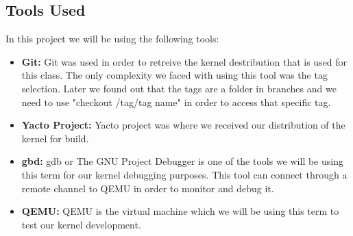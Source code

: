 \documentclass[journal,10pt,onecolumn,compsoc,letterpaper,draftclsnofoot,table,xcdraw]{IEEEtran} \usepackage[margin=0.75in]{geometry}
\begin{document}
\subsection{Tools Used}
In this project we will be using the following tools:
\begin{itemize}
\item \textbf{Git: } Git was used in order to retreive the kernel destribution that is used for this class. The only complexity we faced with using this tool was the tag selection. Later we found out that the tags are a folder in branches and we need to use "checkout /tag/tag name" in order to access that specific tag.\\
\item \textbf{Yacto Project: } Yacto project was where we received our distribution of the kernel for build.\\
\item \textbf{gbd: } gdb or The GNU Project Debugger is one of the tools we will be using this term for our kernel debugging purposes. This tool can connect through a remote channel to QEMU in order to monitor and debug it.\\
\item \textbf{QEMU: } QEMU is the virtual machine which we will be using this term to test our kernel development.\\
\end{itemize}
\end{document}
